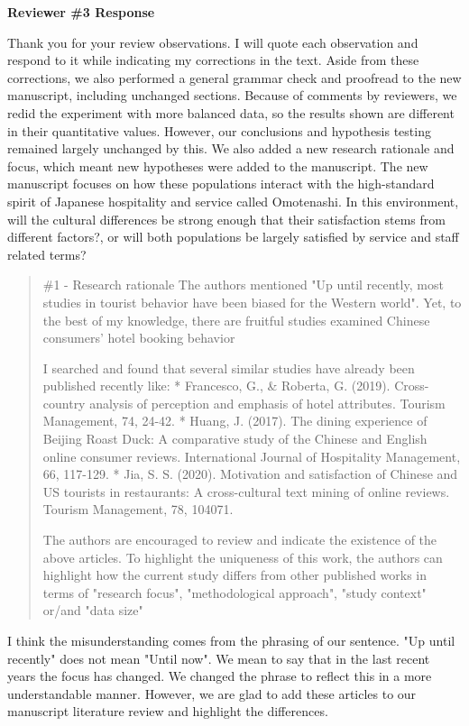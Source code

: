 \documentclass{letter}
\begin{document}



\textbf{Reviewer \#3 Response}

Thank you for your review observations. I will quote each observation and respond to it while indicating my corrections in the text.
Aside from these corrections, we also performed a general grammar check and proofread to the new manuscript, including unchanged sections. Because of comments by reviewers, we redid the experiment with more balanced data, so the results shown are different in their quantitative values. However, our conclusions and hypothesis testing remained largely unchanged by this. We also added a new research rationale and focus, which meant new hypotheses were added to the manuscript. The new manuscript focuses on how these populations interact with the high-standard spirit of Japanese hospitality and service called Omotenashi. In this environment, will the cultural differences be strong enough that their satisfaction stems from different factors?, or will both populations be largely satisfied by service and staff related terms?

\begin{quotation}
\#1 - Research rationale
The authors mentioned "Up until recently, most studies in tourist behavior have been biased for the Western world". Yet, to the best of my knowledge, there are fruitful studies examined Chinese consumers' hotel booking behavior

I searched and found that several similar studies have already been published recently like:
*  Francesco, G., \& Roberta, G. (2019). Cross-country analysis of perception and emphasis of hotel attributes. Tourism Management, 74, 24-42.
*  Huang, J. (2017). The dining experience of Beijing Roast Duck: A comparative study of the Chinese and English online consumer reviews. International Journal of Hospitality Management, 66, 117-129.
*  Jia, S. S. (2020). Motivation and satisfaction of Chinese and US tourists in restaurants: A cross-cultural text mining of online reviews. Tourism Management, 78, 104071.

The authors are encouraged to review and indicate the existence of the above articles. To highlight the uniqueness of this work, the authors can highlight how the current study differs from other published works in terms of "research focus", "methodological approach", "study context" or/and "data size"
\end{quotation}


I think the misunderstanding comes from the phrasing of our sentence. "Up until recently" does not mean "Until now". We mean to say that in the last recent years the focus has changed. We changed the phrase to reflect this in a more understandable manner. However, we are glad to add these articles to our manuscript literature review and highlight the differences.
\end{document}
